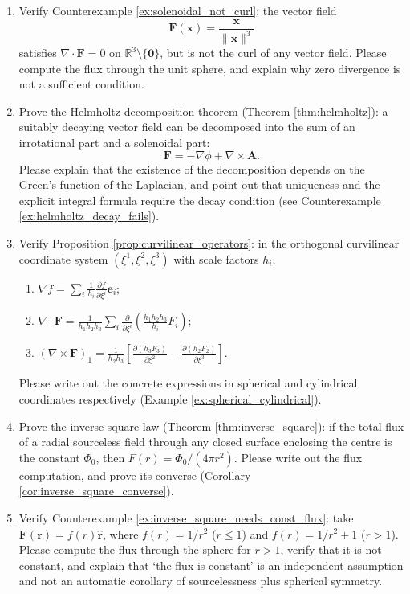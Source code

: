 \begin{enumerate}[leftmargin=3em, label=\textbf{Exercise \arabic*}]
    \item Verify Counterexample \ref{ex:solenoidal_not_curl}:
    the vector field
    \[
    \mathbf{F}(\mathbf{x})=\frac{\mathbf{x}}{\|\mathbf{x}\|^3}
    \]
    satisfies $\nabla\cdot\mathbf{F}=0$ on $\mathbb{R}^3\setminus\{\mathbf{0}\}$,
    but is not the curl of any vector field.
    Please compute the flux through the unit sphere, and explain why zero divergence is not a sufficient condition.

    \item Prove the Helmholtz decomposition theorem (Theorem \ref{thm:helmholtz}):
    a suitably decaying vector field can be decomposed into the sum of an irrotational part and a solenoidal part:
    \[
    \mathbf{F}=-\nabla\phi+\nabla\times\mathbf{A}.
    \]
    Please explain that the existence of the decomposition depends on the Green's function of the Laplacian,
    and point out that uniqueness and the explicit integral formula require the decay condition (see Counterexample \ref{ex:helmholtz_decay_fails}).

    \item Verify Proposition \ref{prop:curvilinear_operators}:
    in the orthogonal curvilinear coordinate system $(\xi^1,\xi^2,\xi^3)$ with scale factors $h_i$,
    \begin{enumerate}[label=(\roman*)]
        \item $\nabla f=\sum_i\frac{1}{h_i}\frac{\partial f}{\partial\xi^i}\mathbf{e}_i$;
        \item $\nabla\cdot\mathbf{F}=\frac{1}{h_1h_2h_3}\sum_i
              \frac{\partial}{\partial\xi^i}\left(\frac{h_1h_2h_3}{h_i}F_i\right)$;
        \item $(\nabla\times\mathbf{F})_1=\frac{1}{h_2h_3}
              \left[\frac{\partial(h_3F_3)}{\partial\xi^2}
              -\frac{\partial(h_2F_2)}{\partial\xi^3}\right]$.
    \end{enumerate}
    Please write out the concrete expressions in spherical and cylindrical coordinates respectively (Example \ref{ex:spherical_cylindrical}).

    \item Prove the inverse-square law (Theorem \ref{thm:inverse_square}):
    if the total flux of a radial sourceless field through any closed surface enclosing the centre is the constant $\Phi_0$,
    then $F(r)=\Phi_0/(4\pi r^2)$.
    Please write out the flux computation, and prove its converse (Corollary \ref{cor:inverse_square_converse}).

    \item Verify Counterexample \ref{ex:inverse_square_needs_const_flux}:
    take $\mathbf{F}(\mathbf{r})=f(r)\hat{\mathbf{r}}$,
    where $f(r)=1/r^2$ ($r\le1$) and $f(r)=1/r^2+1$ ($r>1$).
    Please compute the flux through the sphere for $r>1$, verify that it is not constant,
    and explain that `the flux is constant' is an independent assumption and not an automatic corollary of sourcelessness plus spherical symmetry.


\end{enumerate}
